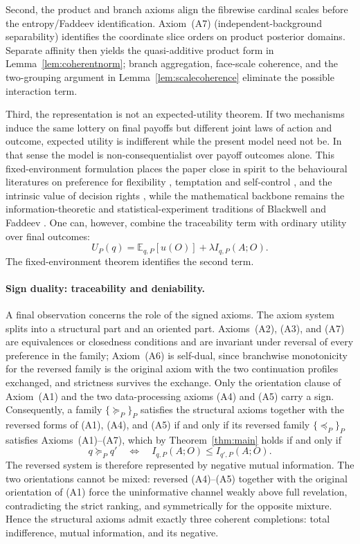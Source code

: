 \documentclass[11pt,a4paper]{article}
\theoremstyle{definition}
\newcommand{\E}{\mathbb E}
\newcommand{\1}{\mathbf 1}
\begin{document}
Second, the product and branch axioms align the fibrewise cardinal scales before the entropy/Faddeev identification.
Axiom~\textup{(A7)} (independent-background separability) identifies the coordinate slice orders on product posterior
domains.  Separate affinity then yields the quasi-additive product form in Lemma~\ref{lem:coherentnorm}; branch
aggregation, face-scale coherence, and the two-grouping argument in Lemma~\ref{lem:scalecoherence} eliminate the possible
interaction term.

Third, the representation is not an expected-utility theorem.  If two mechanisms induce the same lottery on final payoffs
but different joint laws of action and outcome, expected utility is indifferent while the present model need not be.  In that
sense the model is non-consequentialist over payoff outcomes alone.
This fixed-environment formulation places the paper close in spirit to the behavioural literatures on preference
for flexibility \cite{Kreps1979}, temptation and self-control \cite{GulPesendorfer2001}, and the intrinsic value of
decision rights \cite{BartlingFehrHerz2014}, while the mathematical backbone remains the information-theoretic and
statistical-experiment traditions of Blackwell \cite{Blackwell1953} and Faddeev \cite{Faddeev1956}.
One can, however, combine the traceability term with ordinary
utility over final outcomes:
\[
U_P(q)=\E_{q,P}[u(O)]+\lambda I_{q,P}(A;O).
\]
The fixed-environment theorem identifies the second term.

\paragraph{Sign duality: traceability and deniability.}
A final observation concerns the role of the signed axioms.  The axiom system splits into a structural part and an
oriented part.  Axioms~\textup{(A2)}, \textup{(A3)}, and \textup{(A7)} are equivalences or closedness
conditions and are invariant under reversal of every preference in the family; Axiom~\textup{(A6)} is self-dual, since
branchwise monotonicity for the reversed family is the original axiom with the two continuation profiles exchanged, and
strictness survives the exchange.  Only the orientation clause of Axiom~\textup{(A1)} and the two data-processing axioms
\textup{(A4)} and \textup{(A5)} carry a sign.  Consequently, a family $\{\succeq_P\}_P$ satisfies the structural axioms
together with the reversed forms of \textup{(A1)}, \textup{(A4)}, and \textup{(A5)} if and only if its reversed family
$\{\preceq_P\}_P$ satisfies Axioms~\textup{(A1)--(A7)}, which by Theorem~\ref{thm:main} holds if and only if
\[
q\succeq_P q'
\quad\Longleftrightarrow\quad
I_{q,P}(A;O)\le I_{q',P}(A;O).
\]
The reversed system is therefore represented by negative mutual information.  The two orientations cannot be mixed:
reversed \textup{(A4)}--\textup{(A5)} together with the original orientation of \textup{(A1)} force the uninformative
channel weakly above full revelation, contradicting the strict ranking, and symmetrically for the opposite mixture.
Hence the structural axioms admit exactly three coherent completions: total indifference, mutual information, and its
negative.
\end{document}
